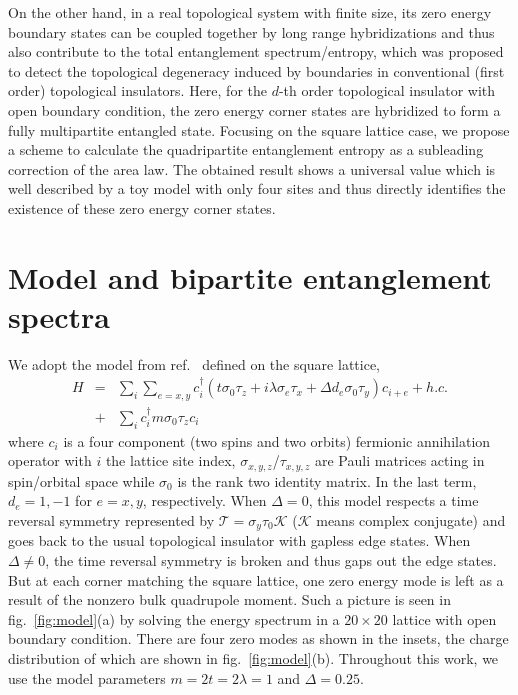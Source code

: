 \documentclass[doublecol]{epl2} %
\begin{document}
On the other hand, in a real topological system with finite size, its zero energy boundary states can be coupled together by long range hybridizations and thus also contribute to the total entanglement spectrum/entropy, which was proposed to detect the topological degeneracy induced by boundaries in conventional (first order) topological insulators. \cite{Wang_PRB_2015} Here, for the $d$-th order topological insulator with open boundary condition, the zero energy corner states are hybridized to form a fully multipartite entangled state. Focusing on the square lattice case, we propose a scheme to calculate the quadripartite entanglement entropy as a subleading correction of the area law. The obtained result shows a universal value which is well described by a toy model with only four sites and thus directly identifies the existence of these zero energy corner states. 

\section{Model and bipartite entanglement spectra}

We adopt the model from ref.~\cite{Schindler_SA_2018} defined on the square lattice,
\begin{eqnarray} \label{eq:model}
H &=& \sum_{i}\sum_{e=x,y} c_i^\dag\left( t\sigma_0\tau_z + i\lambda \sigma_e\tau_x + \Delta d_e \sigma_0\tau_y \right)c_{i+e} + h.c. \nonumber\\ 
&+& \sum_i c_i^\dag m\sigma_0 \tau_z c_i
\end{eqnarray}
where $c_i$ is a four component (two spins and two orbits) fermionic annihilation operator with $i$ the lattice site index, $\sigma_{x,y,z}$/$\tau_{x,y,z}$ are Pauli matrices acting in spin/orbital space while $\sigma_0$ is the rank two identity matrix. In the last term, $d_e=1,-1$ for $e=x,y$, respectively. When $\Delta=0$, this model respects a time reversal symmetry represented by $\mathcal{T}=\sigma_y\tau_0\mathcal{K}$ ($\mathcal{K}$ means complex conjugate) and goes back to the usual topological insulator with gapless edge states. \cite{Qi_PRB_2008} When $\Delta\ne0$, the time reversal symmetry is broken and thus gaps out the edge states. But at each corner matching the square lattice, one zero energy mode is left as a result of the nonzero bulk quadrupole moment. \cite{Benalcazar_S_2017} Such a picture is seen in fig.~\ref{fig:model}(a) by solving the energy spectrum in a $20\times20$ lattice with open boundary condition. There are four zero modes as shown in the insets, the charge distribution of which are shown in fig.~\ref{fig:model}(b). Throughout this work, we use the model parameters $m=2t=2\lambda=1$ and $\Delta=0.25$. 
\end{document}
